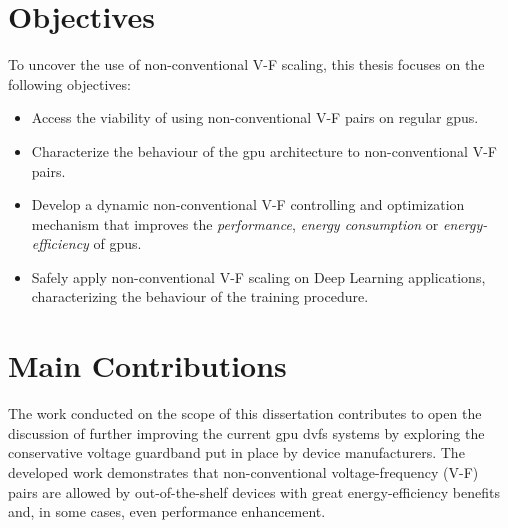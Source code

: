 

\section{Objectives}
\label{section:objectives}

To uncover the use of non-conventional V-F scaling, this thesis focuses on the following objectives:

\begin{itemize}
\item Access the viability of using non-conventional V-F pairs on regular \acrshort{gpu}s.
\item Characterize the behaviour of the \acrshort{gpu} architecture to non-conventional V-F pairs.
\item Develop a dynamic non-conventional V-F controlling and optimization mechanism that improves the \textit{performance}, \textit{energy consumption} or \textit{energy-efficiency} of \acrshort{gpu}s.
\item Safely apply non-conventional V-F scaling on Deep Learning applications, characterizing the behaviour of the training procedure.
\end{itemize}


\section{Main Contributions}
\label{section:main_contri}

The work conducted on the scope of this dissertation contributes to open the discussion of further improving the current \acrshort{gpu} \acrshort{dvfs} systems by exploring the conservative voltage guardband put in place by device manufacturers. The developed work demonstrates that non-conventional voltage-frequency (V-F) pairs are allowed by out-of-the-shelf devices with great energy-efficiency benefits and, in some cases, even performance enhancement. 

